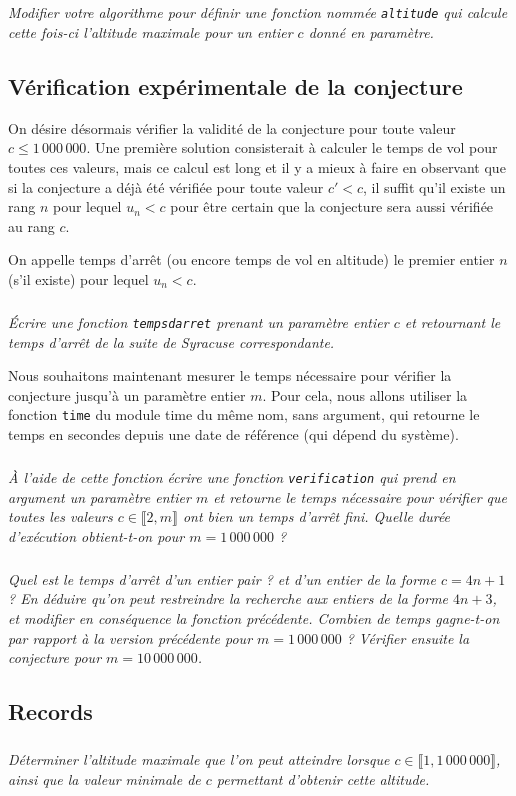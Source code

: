 \begin{multicols}{2}
\subparagraph{}\textit{Modifier votre algorithme pour définir une fonction nommée \texttt{altitude} qui calcule cette fois-ci l’altitude maximale pour un entier $c$ donné en paramètre.}

\subsection*{Vérification expérimentale de la conjecture}

On désire désormais vérifier la validité de la conjecture pour toute valeur $c \leq 1\,000\, 000$. Une première solution consisterait à calculer le temps de vol pour toutes ces valeurs, mais ce calcul est long et il y a mieux à faire en observant que si la conjecture a déjà été vérifiée pour toute valeur $c'<c$, il suffit qu’il existe un rang $n$ pour lequel $u_n < c$ pour être certain que la conjecture sera aussi vérifiée au rang $c$.


On appelle temps d’arrêt (ou encore temps de vol en altitude) le premier entier $n$ (s’il existe) pour lequel $u_n < c$.

\subparagraph{}\textit{ Écrire une fonction \texttt{tempsdarret} prenant un paramètre entier $c$ et retournant le temps d’arrêt de la suite de Syracuse correspondante.}

Nous souhaitons maintenant mesurer le temps nécessaire pour vérifier la conjecture jusqu’à un paramètre entier $m$. Pour cela, nous allons utiliser la fonction \texttt{time} du module time du même nom, sans argument, qui retourne le temps en secondes depuis une date de référence (qui dépend du système).

\subparagraph{}\textit{À l’aide de cette fonction écrire une fonction \texttt{verification} qui prend en argument un paramètre entier $m$ et retourne le temps nécessaire pour vérifier que toutes les valeurs $c\in \llbracket 2,m \rrbracket$  ont bien un temps d’arrêt fini.
Quelle durée d’exécution obtient-t-on pour $ m = 1\,000\,000$ ?}

\subparagraph{}\textit{Quel est le temps d’arrêt d’un entier pair ? et d’un entier de la forme $c = 4n + 1$ ? En déduire qu’on peut restreindre la
recherche aux entiers de la forme $4n+ 3$, et modifier en conséquence la fonction précédente. Combien de temps gagne-t-on
par rapport à la version précédente pour $m = 1\,000\,000$ ?
Vérifier ensuite la conjecture pour $m = 10\,000\,000$.
}

\subsection*{Records}
\subparagraph{}\textit{Déterminer l’altitude maximale que l’on peut atteindre lorsque $c \in \llbracket 1,1\,000\,000\rrbracket$, ainsi que la valeur minimale de $c$ permettant d’obtenir cette altitude.}


\end{multicols}
